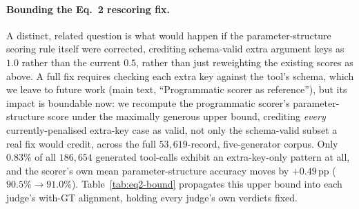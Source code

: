\paragraph{Bounding the Eq.~2 rescoring fix.} A distinct, related question is what would happen if the parameter-structure scoring rule itself were corrected, crediting schema-valid extra argument keys as $1.0$ rather than the current $0.5$, rather than just reweighting the existing scores as above. A full fix requires checking each extra key against the tool's schema, which we leave to future work (main text, ``Programmatic scorer as reference''), but its impact is boundable now: we recompute the programmatic scorer's parameter-structure score under the maximally generous upper bound, crediting \emph{every} currently-penalised extra-key case as valid, not only the schema-valid subset a real fix would credit, across the full $53{,}619$-record, five-generator corpus. Only $0.83\%$ of all $186{,}654$ generated tool-calls exhibit an extra-key-only pattern at all, and the scorer's own mean parameter-structure accuracy moves by $+0.49$\,pp ($90.5\%\to91.0\%$). Table~\ref{tab:eq2-bound} propagates this upper bound into each judge's with-GT alignment, holding every judge's own verdicts fixed.

\begin{table}[h!]
\centering
\small
\setlength{\tabcolsep}{4pt}
\renewcommand{\arraystretch}{1.1}
\caption{With-GT alignment (\%) under the current parameter-structure rule vs.\ the maximally generous upper-bound correction, record-weighted across the full corpus. Judges' own verdicts are held fixed; only the programmatic reference's parameter-structure score changes. Ranking order is identical to the current one in both columns.}
\label{tab:eq2-bound}
\end{table}

